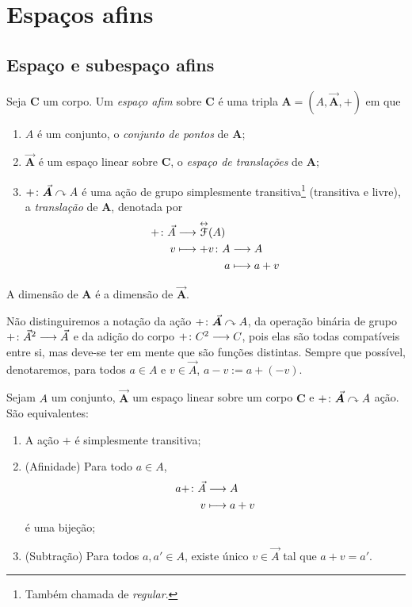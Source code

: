 \chapter{Espaços afins}

\section{Espaço e subespaço afins}

\begin{definition}
Seja $\bm C$ um corpo. Um \emph{espaço afim} sobre $\bm C$ é uma tripla $\bm A = (A,\vec{\bm A},+)$ em que
	\begin{enumerate}
		\item $A$ é um conjunto, o \emph{conjunto de pontos} de $\bm A$;
		\item $\vec{\bm A}$ é um espaço linear sobre $\bm C$, o \emph{espaço de translações} de $\bm A$;
		\item $+\colon \vec{\bm A} \curvearrowright A$ é uma ação de grupo simplesmente transitiva\footnote{Também chamada de \emph{regular}.} (transitiva e livre), a \emph{translação} de $\bm A$, denotada por
			\begin{align*}
				\func{+}{\vec{A}}{\Iso{\Func}(A)}{v}{
					\begin{aligned}[t]
						\func{+v}{A}{A}{a}{a+v}
					\end{aligned}
				}
			\end{align*}
	\end{enumerate}
A dimensão de $\bm A$ é a dimensão de $\vec{\bm A}$.
\end{definition}

Não distinguiremos a notação da ação $+\colon \vec{\bm A} \curvearrowright A$, da operação binária de grupo ${+}\colon {\vec{A}^2} \longrightarrow {\vec{A}}$ e da adição do corpo ${+}\colon {C^2} \longrightarrow {C}$, pois elas são todas compatíveis entre si, mas deve-se ter em mente que são funções distintas. Sempre que possível, denotaremos, para todos $a \in A$ e $v \in \vec{A}$, $a-v := a+(-v)$.


\begin{proposition}
Sejam $A$ um conjunto, $\vec{\bm A}$ um espaço linear sobre um corpo $\bm C$ e $+\colon \vec{\bm A} \curvearrowright A$ ação. São equivalentes:
	\begin{enumerate}
		\item A ação $+$ é simplesmente transitiva;
		\item (Afinidade) Para todo $a \in A$,
			\begin{align*}
				{a+}\colon {\vec{A}} &\longrightarrow {A} \\{v} &\longmapsto a+v
			\end{align*}
		é uma bijeção;
		\item (Subtração) Para todos $a,a' \in A$, existe único $v \in \vec{A}$ tal que $a+v=a'$.
	\end{enumerate}
\end{proposition}

